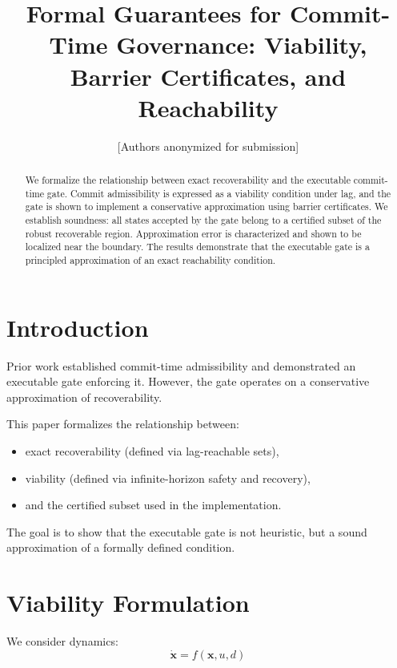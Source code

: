 \documentclass[letterpaper, 10 pt, conference]{ieeeconf}
\title{\bf Formal Guarantees for Commit-Time Governance: Viability, Barrier Certificates, and Reachability}
\author{[Authors anonymized for submission]}
\begin{document}
\maketitle
\thispagestyle{empty}
\pagestyle{empty}

\begin{abstract}
We formalize the relationship between exact recoverability and the executable commit-time gate. Commit admissibility is expressed as a viability condition under lag, and the gate is shown to implement a conservative approximation using barrier certificates. We establish soundness: all states accepted by the gate belong to a certified subset of the robust recoverable region. Approximation error is characterized and shown to be localized near the boundary. The results demonstrate that the executable gate is a principled approximation of an exact reachability condition.
\end{abstract}

\section{Introduction}

Prior work established commit-time admissibility and demonstrated an executable gate enforcing it. However, the gate operates on a conservative approximation of recoverability.

This paper formalizes the relationship between:
\begin{itemize}
\item exact recoverability (defined via lag-reachable sets),
\item viability (defined via infinite-horizon safety and recovery),
\item and the certified subset used in the implementation.
\end{itemize}

The goal is to show that the executable gate is not heuristic, but a sound approximation of a formally defined condition.

\section{Viability Formulation}

We consider dynamics:
\begin{equation}
\dot{\mathbf{x}} = f(\mathbf{x}, u, d)
\end{equation}
\end{document}
